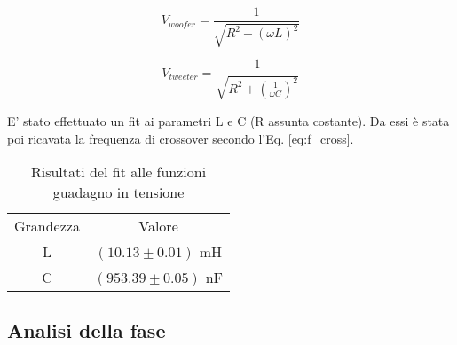 \documentclass[../Relazione_circuiti]{subfiles}
\begin{document}
\begin{equation}
V_{woofer} = \frac{1}{\sqrt{R^2+(\omega L)^2}}
\end{equation}

\begin{equation}
V_{tweeter} = \frac{1}{\sqrt{R^2+(\frac{1}{\omega C})^2}}
\end{equation}



E' stato effettuato un fit ai parametri L e C (R assunta costante). Da essi è stata poi ricavata la frequenza di crossover secondo l'Eq. \ref{eq:f_cross}. 

\begin{table}

\begin{tabular}{c | c }

Grandezza & Valore \\

L & $(10.13 \pm 0.01)$ mH \\
C & $(953.39 \pm 0.05)$ nF

\end{tabular}

\caption{Risultati del fit alle funzioni guadagno in tensione}
\label{tab: fit_amplitude}

\end{table}



\subsection{Analisi della fase}
\end{document}
